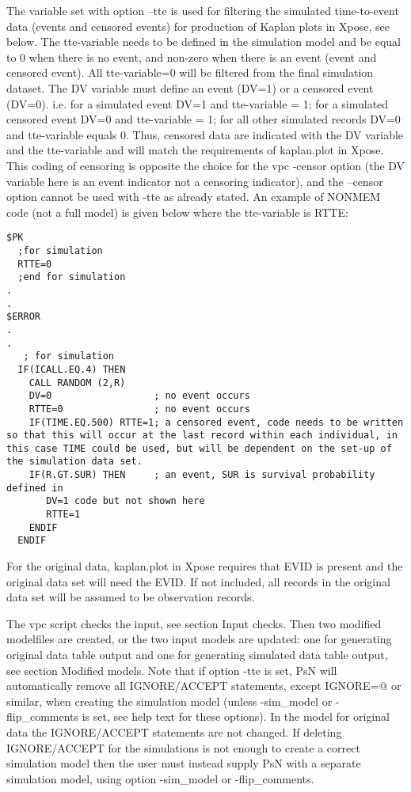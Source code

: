 The variable set with option –tte is used for filtering the simulated time-to-event data (events and censored events) for production of Kaplan plots in Xpose, see below. The tte-variable needs to be defined in the simulation model and be equal to 0 when there is no event, and non-zero when there is an event (event and censored event). All tte-variable=0 will be filtered from the final simulation dataset. The DV variable must define an event (DV=1) or a censored event (DV=0).  i.e. for a simulated event DV=1 and tte-variable = 1; for a simulated censored event DV=0 and tte-variable = 1; for all other simulated records DV=0 and tte-variable equals 0. Thus, censored data are indicated with the DV variable and the tte-variable and will match the requirements of kaplan.plot in Xpose. This coding of censoring is opposite the choice for the vpc -censor option (the DV variable here is an event indicator not a censoring indicator), and the –censor option cannot be used with -tte as already stated. An example of NONMEM code (not a full model) is given below where the tte-variable is RTTE:

\begin{verbatim}
$PK
  ;for simulation
  RTTE=0
  ;end for simulation
.
.
$ERROR
.
.
   ; for simulation 
  IF(ICALL.EQ.4) THEN
    CALL RANDOM (2,R)
    DV=0                  ;	no event occurs
    RTTE=0                ;	no event occurs 
    IF(TIME.EQ.500) RTTE=1; a censored event, code needs to be written so that this will occur at the last record within each individual, in this case TIME could be used, but will be dependent on the set-up of the simulation data set.
    IF(R.GT.SUR) THEN     ; an event, SUR is survival probability defined in
       DV=1	code but not shown here
       RTTE=1
    ENDIF
  ENDIF
\end{verbatim}


For the original data, kaplan.plot in Xpose requires that EVID is present and the original data set will need the EVID. If not included, all records in the original data set will be assumed to be observation records.

The vpc script checks the input, see section Input checks. Then two modified modelfiles are created, or the two input models are updated: one for generating original data table output and one for generating simulated data table output, see section Modified models. Note that if option -tte is set, PsN will automatically remove all  IGNORE/ACCEPT statements, except IGNORE=@ or similar,  when creating the simulation model (unless -sim\_model or -flip\_comments is set, see help text for these options). In the model for original data the IGNORE/ACCEPT statements are not changed. If deleting IGNORE/ACCEPT for the simulations is not enough to create a correct simulation model then the user must instead supply PsN with a separate simulation model, using option -sim\_model or -flip\_comments.

